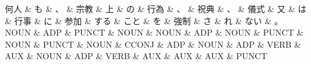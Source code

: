 \documentclass[tikz,border=5pt]{standalone}
\begin{document}
\normalsize
\begin{dependency}[edge unit distance=12.0pt]
    \begin{deptext}[column sep=1em]
        何人 \& も \& 、 \& 宗教 \& 上 \& の \& 行為 \& 、 \& 祝典 \& 、 \& 儀式 \& 又 \& は \& 行事 \& に \& 参加 \& する \& こと \& を \& 強制 \& さ \& れ \& ない \& 。\\
        NOUN \& ADP \& PUNCT \& NOUN \& NOUN \& ADP \& NOUN \& PUNCT \& NOUN \& PUNCT \& NOUN \& CCONJ \& ADP \& NOUN \& ADP \& VERB \& AUX \& NOUN \& ADP \& VERB \& AUX \& AUX \& AUX \& PUNCT\\
    \end{deptext}
\end{dependency}
\end{document}
